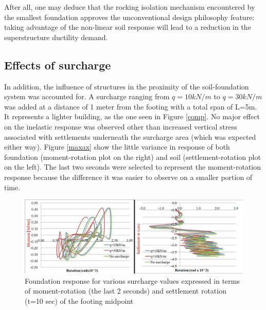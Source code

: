 

After all, one may deduce that the rocking isolation mechanism encountered by the smallest foundation approves the unconventional design philosophy feature: taking advantage of the non-linear soil response will lead to a reduction in the superstructure ductility demand. 


\subsection{Effects of surcharge}
In addition, the influence of structures in the proximity of the soil-foundation system was accounted for. A surcharge ranging from $q=10kN/m$ to $q=30kN/m$ was added at a distance of 1 meter from the footing with a total span of L=5m. It represents a lighter building, as the one seen in Figure \ref{comp}. No major effect on the inelastic response was observed other than increased vertical stress associated with settlements underneath the surcharge area (which was expected either way). Figure \ref{maxax} show the little variance in response of both foundation (moment-rotation plot on the right) and soil (settlement-rotation plot on the left). The last two seconds were selected to represent the moment-rotation response because the difference it was easier to observe on a smaller portion of time.

	\begin{figure}[!h]
		\centering
		\includegraphics[width=0.9 \linewidth]{"surcharge2"}
		\caption{Foundation response for various surcharge values expressed in terms of moment-rotation (the last 2 seconds) and settlement rotation (t=10 sec) of the footing midpoint}
		\label{surch}
	\end{figure}

